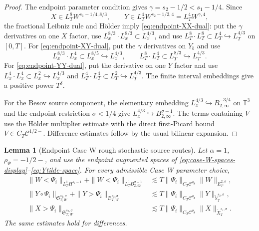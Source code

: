 \documentclass[10pt]{amsart}
\numberwithin{equation}{section}
\theoremstyle{plain}
\newtheorem{lemma}[theorem]{Lemma}
\theoremstyle{definition}
\theoremstyle{remark}
\begin{document}
\begin{proof}
The endpoint parameter condition gives $\gamma=s_2-1/2<s_1-1/4$.  Since
\[
        X\in L_T^8W^{s_1-1/4,8/3},
        \qquad
        Y\in L_T^4W^{s_2-1/2,4}=L_T^4W^{\gamma,4},
\]
the fractional Leibniz rule and H\"older imply \eqref{eq:endpoint-XX-dual}: put the $\gamma$ derivatives on one $X$ factor, use $L_x^{8/3}\cdot L_x^{8/3}\subset L_x^{4/3}$, and use $L_T^8\cdot L_T^8\subset L_T^4\hookrightarrow L_T^{4/3}$ on $[0,T]$.  For \eqref{eq:endpoint-XY-dual}, put the $\gamma$ derivatives on $Y_b$ and use
\[
        L_x^{8/3}\cdot L_x^4\subset L_x^{8/5}\hookrightarrow L_x^{4/3},
        \qquad
        L_T^8\cdot L_T^4\subset L_T^{8/3}\hookrightarrow L_T^{4/3}.
\]
For \eqref{eq:endpoint-YY-dual}, put the derivative on one $Y$ factor and use $L_x^4\cdot L_x^4\subset L_x^2\hookrightarrow L_x^{4/3}$ and $L_T^4\cdot L_T^4\subset L_T^2\hookrightarrow L_T^{4/3}$.  The finite interval embeddings give a positive power $T^\delta$.

For the Besov source component, the elementary embedding $L_x^{4/3}\hookrightarrow B_{2,\infty}^{-3/4}$ on $\mathbb T^3$ and the endpoint restriction $\sigma<1/4$ give $L_x^{4/3}\hookrightarrow B_{2,\infty}^{\sigma-1}$.  The terms containing $V$ use the H\"older multiplier estimate with the direct first-Picard bound $V\in C_T\mathcal C^{1/2-}$.  Difference estimates follow by the usual bilinear expansion.
\end{proof}


\begin{lemma}[Endpoint Case W rough stochastic source routes]\label{lem:caseW-rough-stochastic-routes}
Let \(\alpha=1\), \(\rho_\Psi=-1/2-\), and use the endpoint augmented spaces of \eqref{eq:case-W-spaces-display}--\eqref{eq:Ytilde-space}.  For every admissible Case W parameter choice,
\begin{align}
\|W<\Psi_i\|_{L_T^1H^{s_1-1}}
+\|W<\Psi_i\|_{L_T^1B_{2,\infty}^{\sigma-1}}
&\lesssim
T\|\Psi_i\|_{C_T\mathcal C^{\rho_\Psi}}\|W\|_{E_T^{2,\sigma}},
\label{eq:caseW-WlowPsi-route}\\
\|Y\circ\Psi_i\|_{\mathfrak S_{T,W}^{s_2,\sigma}}
+\|Y>\Psi_i\|_{\mathfrak S_{T,W}^{s_2,\sigma}}
&\lesssim
T\|\Psi_i\|_{C_T\mathcal C^{\rho_\Psi}}
\|Y\|_{\widetilde Y_T^{s_2,\sigma}},
\label{eq:caseW-Ypsi-route}\\
\|X>\Psi_i\|_{\mathfrak S_{T,W}^{s_2,\sigma}}
&\lesssim
T\|\Psi_i\|_{C_T\mathcal C^{\rho_\Psi}}
\|X\|_{\widetilde X_T^{s_1,\sigma}}.
\label{eq:caseW-XgreaterPsi-route}
\end{align}
The same estimates hold for differences.
\end{lemma}
\end{document}
